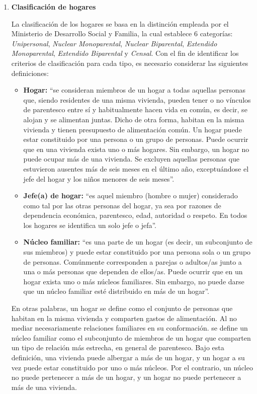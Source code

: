 \documentclass[12pt,letterpaper,spanish]{article}
\begin{document}
\begin{enumerate}

\item \textbf{Clasificación de hogares}

La clasificación de los hogares se basa en la distinción empleada por el Ministerio de Desarrollo Social y Familia, la cual establece 6 categorías: \textit{Unipersonal}, \textit{Nuclear Monoparental}, \textit{Nuclear Biparental}, \textit{Extendido Monoparental}, \textit{Extendido Biparental} y \textit{Censal}. Con el fin de identificar los criterios de clasificación para cada tipo, es necesario considerar las siguientes definiciones:
\begin{itemize}
    \item \textbf{Hogar:} ``se consideran miembros de un hogar a todas aquellas personas que, siendo residentes de una misma vivienda, pueden tener o no vínculos de parentesco entre sí y habitualmente hacen vida en común, es decir, se alojan y se alimentan juntas. Dicho de otra forma, habitan en la misma vivienda y tienen presupuesto de alimentación común. Un hogar puede estar constituido por una persona o un grupo de personas. Puede ocurrir que en una vivienda exista uno o más hogares. Sin embargo, un hogar no puede ocupar más de una vivienda.
Se excluyen aquellas personas que estuvieron ausentes más de seis meses en el último año, exceptuándose el jefe del hogar y los niños menores de seis meses''. \cite{MDS2019Manual2017}
    
    \item \textbf{Jefe(a) de hogar:} ``es aquel miembro (hombre o mujer) considerado como tal por las otras personas del hogar, ya sea por razones de dependencia económica, parentesco, edad, autoridad o respeto. En todos los hogares se identifica un solo jefe o jefa''. \cite{MDS2019Manual2017}
    
    \item \textbf{Núcleo familiar:} ``es una parte de un hogar (es decir, un subconjunto de sus miembros) y puede estar constituido por una persona sola o un grupo de personas. Comúnmente corresponden a parejas o adultos/as junto a una o más personas que dependen de ellos/as. Puede ocurrir que en un hogar exista uno o más núcleos familiares. Sin embargo, no puede darse que un núcleo familiar esté distribuido en más de un hogar''. \cite{MDS2019Manual2017}
\end{itemize}

En otras palabras, un hogar se define como el conjunto de personas que habitan en la misma vivienda y comparten gastos de alimentación. Al no mediar necesariamente relaciones familiares en su conformación. se define un núcleo familiar como el subconjunto de miembros de un hogar que comparten un tipo de relación más estrecha, en general de parentesco. Bajo esta definición, una vivienda puede albergar a más de un hogar, y un hogar a su vez puede estar constituido por uno o más núcleos. Por el contrario, un núcleo no puede pertenecer a más de un hogar, y un hogar no puede pertenecer a más de una vivienda.



\end{enumerate}
\end{document}
